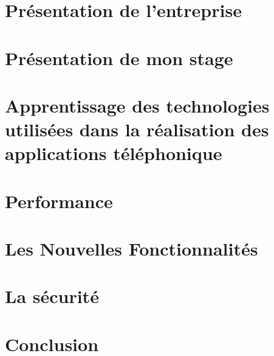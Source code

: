 \documentclass[asi]{picINSA}
\begin{document}
 \couverture{}
 \informationsGenerales{}


 
 \tableofcontents

 \listoffigures

 \chapter{Présentation de l'entreprise}
	

 \chapter{Présentation de mon stage}
	
 
 \chapter{Apprentissage des technologies utilisées dans la réalisation des applications téléphonique}
 	

 \chapter{Performance}
	

 \chapter{Les Nouvelles Fonctionnalités}
	

 \chapter{La sécurité}
	

 \chapter{Conclusion}
	

 \pageQuatriemeCouverture{}	
\end{document}
